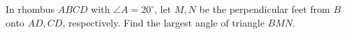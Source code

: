 In rhombus $ABCD$ with $\angle A=20^\circ$, let $M,N$ be the perpendicular feet from $B$ onto $AD,CD$, respectively. Find the largest angle of triangle $BMN$.
